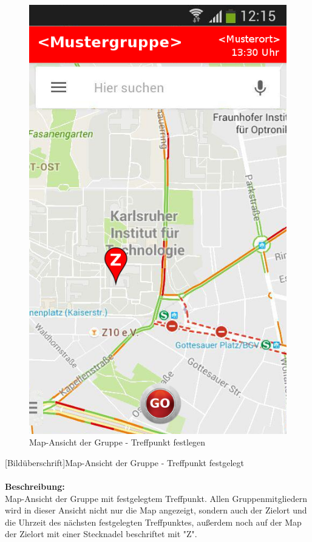 \begin{figure}[H]
	\caption{Map-Ansicht der Gruppe - Treffpunkt festlegen}
\begin{center}
	\includegraphics[scale =0.5]{resources/images/map.png}
\end{center}
\end{figure}
[Bildüberschrift]Map-Ansicht der Gruppe - Treffpunkt festgelegt\\ \\
\textbf{Beschreibung:}\\
Map-Ansicht der Gruppe mit festgelegtem Treffpunkt. Allen Gruppenmitgliedern wird in dieser Ansicht nicht nur die Map angezeigt, sondern auch der Zielort und die Uhrzeit des nächsten festgelegten Treffpunktes, außerdem noch auf der Map der Zielort mit einer Stecknadel beschriftet mit "Z".\\
